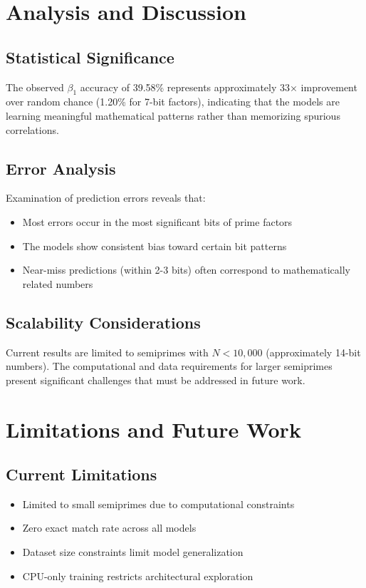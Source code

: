 \documentclass[12pt]{article}
\begin{document}
\section{Analysis and Discussion}

\subsection{Statistical Significance}

The observed $\beta_1$ accuracy of 39.58\% represents approximately 33× improvement over random chance (1.20\% for 7-bit factors), indicating that the models are learning meaningful mathematical patterns rather than memorizing spurious correlations.

\subsection{Error Analysis}

Examination of prediction errors reveals that:
\begin{itemize}
\item Most errors occur in the most significant bits of prime factors
\item The models show consistent bias toward certain bit patterns
\item Near-miss predictions (within 2-3 bits) often correspond to mathematically related numbers
\end{itemize}

\subsection{Scalability Considerations}

Current results are limited to semiprimes with $N < 10,000$ (approximately 14-bit numbers). The computational and data requirements for larger semiprimes present significant challenges that must be addressed in future work.

\section{Limitations and Future Work}

\subsection{Current Limitations}
\begin{itemize}
\item Limited to small semiprimes due to computational constraints
\item Zero exact match rate across all models
\item Dataset size constraints limit model generalization
\item CPU-only training restricts architectural exploration
\end{itemize}
\end{document}

